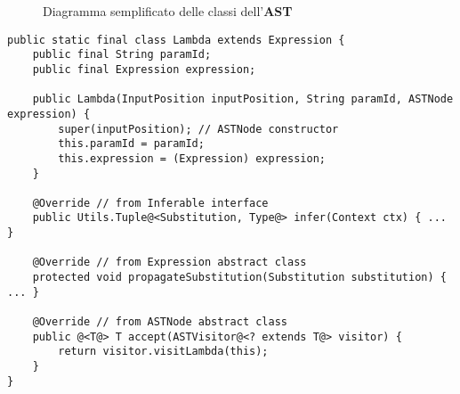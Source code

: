 \begin{figure}
    \caption{Diagramma semplificato delle classi dell'\textbf{AST}}
    \label{fig:5-5-ast-classes}
    \vspace{4mm}
\end{figure}

\begin{lstlisting}[caption={Esempio di classe della gerarchia dell'\textbf{AST}}, style=javaCode, label={lst:5-5-ast-class-java}]
public static final class Lambda extends Expression {
    public final String paramId;
    public final Expression expression;

    public Lambda(InputPosition inputPosition, String paramId, ASTNode expression) {
        super(inputPosition); // ASTNode constructor
        this.paramId = paramId;
        this.expression = (Expression) expression;
    }

    @Override // from Inferable interface
    public Utils.Tuple@<Substitution, Type@> infer(Context ctx) { ... }

    @Override // from Expression abstract class
    protected void propagateSubstitution(Substitution substitution) { ... }

    @Override // from ASTNode abstract class
    public @<T@> T accept(ASTVisitor@<? extends T@> visitor) {
        return visitor.visitLambda(this);
    }
}
\end{lstlisting}

